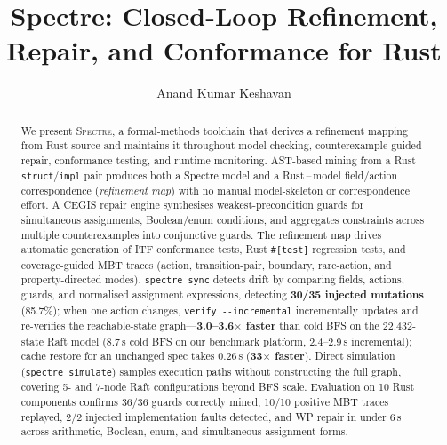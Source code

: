 \documentclass[runningheads]{llncs}
\begin{document}
\title{Spectre: Closed-Loop Refinement, Repair, and Conformance for Rust}

\author{Anand Kumar Keshavan}


\maketitle

\begin{abstract}
We present \textsc{Spectre}, a formal-methods toolchain that derives a
refinement mapping from Rust source and maintains it throughout model checking,
counterexample-guided repair, conformance testing, and runtime monitoring.
AST-based mining from a Rust \texttt{struct}/\texttt{impl} pair produces both
a Spectre model and a Rust\,--\,model field/action correspondence
(\emph{refinement map}) with no manual model-skeleton or correspondence effort.
A CEGIS repair engine synthesises weakest-precondition guards for simultaneous
assignments, Boolean/enum conditions, and aggregates constraints across multiple
counterexamples into conjunctive guards.
The refinement map drives automatic generation of ITF conformance tests,
Rust \texttt{\#[test]} regression tests, and coverage-guided MBT traces
(action, transition-pair, boundary, rare-action, and property-directed modes).
\texttt{spectre sync} detects drift by comparing fields, actions, guards, and
normalised assignment expressions, detecting \textbf{30/35 injected mutations}
(85.7\%); when one action changes, \texttt{verify -{}-incremental} incrementally
updates and re-verifies the reachable-state graph---\textbf{3.0--3.6$\times$ faster} than cold BFS on the
22{,}432-state Raft model (8.7\,s cold BFS on our benchmark platform, 2.4--2.9\,s
incremental); cache restore for an unchanged spec takes 0.26\,s
(\textbf{33$\times$ faster}).
Direct simulation (\texttt{spectre simulate}) samples execution paths
without constructing the full graph, covering 5- and 7-node Raft
configurations beyond BFS scale.
Evaluation on 10 Rust components confirms 36/36 guards correctly mined,
10/10 positive MBT traces replayed, 2/2 injected implementation faults
detected, and WP repair in under 6\,s across arithmetic, Boolean, enum,
and simultaneous assignment forms.

\end{abstract}
\end{document}
